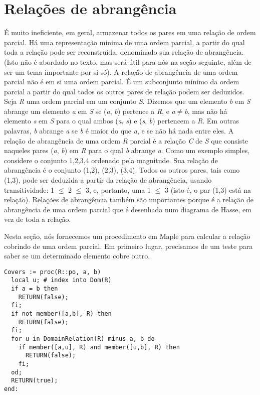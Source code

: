 \documentclass[a4paper]{article}
\begin{document}
\section{Relações de abrangência}
É muito ineficiente, em geral, armazenar todos os pares em uma relação de ordem parcial. Há uma representação mínima de uma ordem parcial, a partir do qual toda a relação pode ser reconstruída, denominado sua relação de abrangência. (Isto não é abordado no texto, mas será útil para nós na seção seguinte, além de ser um tema importante por si só). A relação de abrangência de uma ordem parcial não é em si uma ordem parcial. É um subconjunto mínimo da ordem parcial a partir do qual todos os outros pares de relação podem ser deduzidos. Seja \textit{R} uma ordem parcial em um conjunto \textit{S}. Dizemos que um elemento \textit{b} em \textit{S} abrange um elemento \textit{a} em \textit{S} se (\textit{a}, \textit{b}) pertence a \textit{R}, e \textit{a}$\neq$\textit{b}, mas não há elemento \textit{s} em \textit{S} para o qual ambos (\textit{a}, \textit{s}) e (\textit{s}, \textit{b}) pertencem a \textit{R}. Em outras palavras, \textit{b} abrange \textit{a} se \textit{b} é maior do que \textit{a}, e se não há nada entre eles. A relação de abrangência de uma ordem \textit{R} parcial é a relação \textit{C} de \textit{S} que consiste naqueles pares (\textit{a}, \textit{b}) em \textit{R} para o qual \textit{b} abrange \textit{a}. Como um exemplo simples, considere o conjunto {1,2,3,4} ordenado pela magnitude. Sua relação de abrangência é o conjunto {(1,2), (2,3), (3,4)}. Todos os outros pares, tais como (1,3), pode ser deduzida a partir da relação de abrangência, usando transitividade: 1 $\le$ 2 $\le$ 3, e, portanto, uma 1 $\le$ 3 (isto é, o par (1,3) está na relação). Relações de abrangência também são importantes porque é a relação de abrangência de uma ordem parcial que é desenhada num diagrama de Hasse, em vez de toda a relação.

Nesta seção, nós fornecemos um procedimento em Maple para calcular a relação cobrindo de uma ordem parcial. Em primeiro lugar, precisamos de um teste para saber se um determinado elemento cobre outro.

\begin{lstlisting}
Covers := proc(R::po, a, b)
  local u; # index into Dom(R)
  if a = b then
    RETURN(false);
  fi;
  if not member([a,b], R) then
    RETURN(false);
  fi;
  for u in DomainRelation(R) minus a, b do
    if member([a,u], R) and member([u,b], R) then
      RETURN(false);
    fi;
  od;
  RETURN(true);
end:
\end{lstlisting}
\end{document}
